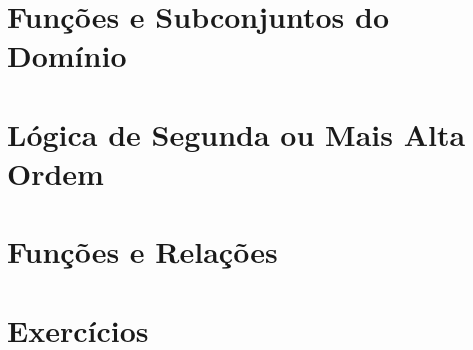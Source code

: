 

\section{Funções e Subconjuntos do Domínio}



\section{Lógica de Segunda ou Mais Alta Ordem}



\section{Funções e Relações}



\section{Exercícios}

